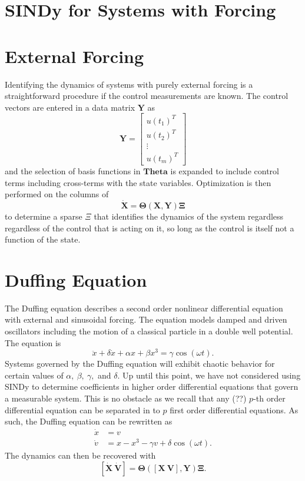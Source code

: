 \documentclass[12pt,preprintnumbers,amsmath,amssymb,titlepage]{report}
\begin{document}
\section*{SINDy for Systems with Forcing}

\section*{External Forcing}
Identifying the dynamics of systems with purely external forcing is a straightforward procedure if the control measurements are known. The control vectors are entered in a data matrix $\bm{Y}$ as
\begin{equation}
	\bm{Y} = 
		\begin{bmatrix}
			u(t_1)^T \\ u(t_2)^T \\ \vdots \\ u(t_m)^T
		\end{bmatrix}
\end{equation}
and the selection of basis functions in $\bm{Theta}$ is expanded to include control terms including cross-terms with the state variables. Optimization is then performed on the columns of 
\begin{equation}
		\bm{\dot{X}} = \bm{\Theta}(\bm{X},\bm{Y})\bm{\Xi}
\end{equation}
to determine a sparse $\Xi$ that identifies the dynamics of the system regardless regardless of the control that is acting on it, so long as the control is itself not a function of the state.

\section*{Duffing Equation}
The Duffing equation describes a second order nonlinear differential equation with external and sinusoidal forcing. The equation models damped and driven oscillators including the motion of a classical particle in a double well potential. The equation is
\begin{equation}
	\ddot x + \delta \dot x + \alpha x + \beta x^3 = \gamma \cos(\omega t).
\end{equation}
Systems governed by the Duffing equation will exhibit chaotic behavior for certain values of $\alpha,\ \beta,\ \gamma,$ and $\delta$.
Up until this point, we have not considered using SINDy to determine coefficients in higher order differential equations that govern a measurable system. This is no obstacle as we recall that any (??) $p$-th order differential equation can be separated in to $p$ first order differential equations. As such, the Duffing equation can be rewritten as 
\begin{align}
	\dot x &= v \\
	\dot v &= x - x^3 - \gamma v + \delta \cos(\omega t).
\end{align}
The dynamics can then be recovered with 
\begin{equation}
		\bm{[\dot{X}\ \dot{V}]} = \bm{\Theta}(\bm{[X\ V]},\bm{Y})\bm{\Xi}.
\end{equation}
\end{document}
